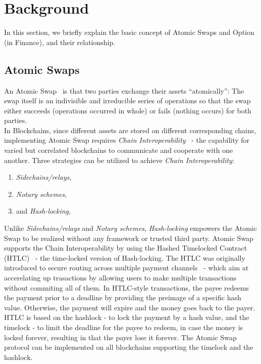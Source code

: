 \section{Background}
\label{sec:background}

In this section, we briefly explain the basic concept of Atomic Swaps and Option (in Finance), and their relationship.

\subsection{Atomic Swaps}

An Atomic Swap~\cite{nolan2013alt} is that two parties exchange their assets ``atomically'':
The swap itself is an indivisible and irreducible series of operations so that the swap either succeeds (operations occurred in whole) or fails (nothing occurs) for both parties. \\

In Blockchains, since different assets are stored on different corresponding chains, implementing Atomic Swap requires \textit{Chain Interoperability}~\cite{buterin2016chain} - the capability for varied but correlated blockchains to communicate and cooperate with one another.
Three strategies can be utilized to achieve \textit{Chain Interoperability}:\\

\begin{enumerate}
    \item \textit{Sidechains/relays},
    \item \textit{Notary schemes},
    \item and \textit{Hash-locking},\\
\end{enumerate}

Unlike \textit{Sidechains/relays} and \textit{Notary schemes}, \textit{Hash-locking} empowers the Atomic Swap to be realized without any framework or trusted third party.
Atomic Swap supports the Chain Interoperability by using the Hashed Timelocked Contract (HTLC)~\cite{poon2016bitcoin} - the time-locked version of Hash-locking.
The HTLC was originally introduced to secure routing across multiple payment channels~\cite{paychannel2018btcwiki} - which aim at accerelating up trasactions by allowing users to make multiple transactions without commiting all of them.
In HTLC-style transactions, the payee redeems the payment prior to a deadline by providing the preimage of a specific hash value.
Otherwise, the payment will expire and the money goes back to the payer.
HTLC is based on the hashlock - to lock the payment by a hash value, and the timelock - to limit the deadline for the payee to redeem, in case the money is locked forever, resulting in that the payer lose it forever.
The Atomic Swap protocol can be implemented on all blockchains supporting the timelock and the hashlock.

